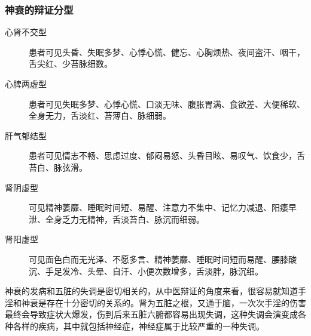 \subsubsection{神衰的辩证分型}

\begin{description}
    \item[心肾不交型] 患者可见头昏、失眠多梦、心悸心慌、健忘、心胸烦热、夜间盗汗、咽干，舌尖红、少苔脉细数。
    \item[心脾两虚型] 患者可见失眠多梦、心悸心慌、口淡无味、腹胀胃满、食欲差、大便稀软、全身无力，舌淡红、苔薄白、脉细弱。
    \item[肝气郁结型] 患者可见情志不畅、思虑过度、郁闷易怒、头昏目眩、易叹气、饮食少，舌苔白、脉弦滑。
    \item[肾阴虚型] 可见精神萎靡、睡眠时间短、易醒、注意力不集中、记忆力减退、阳痿早泄、全身乏力无精神，舌淡苔白、脉沉而细弱。
    \item[肾阳虚型] 可见面色白而无光泽、不愿多言、精神萎靡、睡眠时间短而易醒、腰膝酸沉、手足发冷、头晕、自汗、小便次数增多，舌淡胖，脉沉细。
\end{description}

神衰的发病和五脏的失调是密切相关的，从中医辩证的角度来看，很容易就知道手淫和神衰是存在十分密切的关系的。肾为五脏之根，又通于脑，一次次手淫的伤害最终会导致症状大爆发，伤到后来五脏六腑都容易出现失调，这种失调会演变成各种各样的疾病，其中就包括神经症，神经症属于比较严重的一种失调。

